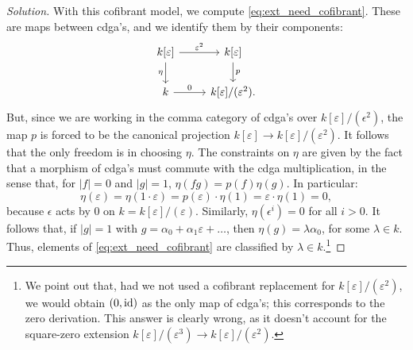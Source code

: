 \documentclass[10pt,a4paper,reqno,oneside]{book} %
\theoremstyle{plain}
\theoremstyle{definition}
\theoremstyle{remark}
\numberwithin{equation}{section}
\begin{document}
\begin{proof}[Solution]
With this cofibrant model, we compute \ref{eq:ext_need_cofibrant}. These are maps between cdga's, and we identify them
by their components:
\[
\begin{tikzcd}
k[\varepsilon]\arrow[swap]{d}{\eta}\arrow{r}{\varepsilon^2} & k[\varepsilon]\arrow{d}{p} \\
k\arrow{r}{0} & k[\varepsilon]/(\varepsilon^2) .
\end{tikzcd}
\]
But, since we are working in the comma category of cdga's over $k[\varepsilon]/(\epsilon^2)$, the map $p$ is forced to be
the canonical projection $k[\varepsilon] \to k[\varepsilon]/(\varepsilon^2)$. It follows that the only freedom is in choosing
$\eta$. The constraints on $\eta$ are given by the fact that a morphism of cdga's must commute with the cdga multiplication, in
the sense that, for $|f| = 0$ and $|g| = 1$, $\eta(fg) = p(f)\eta(g)$. In particular:
\[	\eta(\varepsilon) = \eta(1\cdot \varepsilon) = p(\varepsilon)\cdot \eta(1) = \varepsilon \cdot \eta(1) = 0,	\]
because $\epsilon$ acts by 0 on $k = k[\varepsilon]/(\varepsilon)$. Similarly, $\eta(\epsilon^i) = 0$ for all $i>0$. It follows
that, if $|g| = 1$ with $g = \alpha_0 + \alpha_1 \varepsilon + \dots$, then $\eta(g) = \lambda \alpha_0$, for some $\lambda \in
k$. Thus, elements of \ref{eq:ext_need_cofibrant} are classified by $\lambda \in k$.\footnote{We point out that, had we not
used a cofibrant replacement for $k[\varepsilon]/(\varepsilon^2)$, we would obtain $(0,\mathrm{id})$ as the only map of cdga's; this
corresponds to the zero derivation. This answer is clearly wrong, as it doesn't account for the square-zero extension
$k[\varepsilon]/(\varepsilon^3) \to k[\varepsilon]/(\varepsilon^2)$.}


\end{proof}
\end{document}
